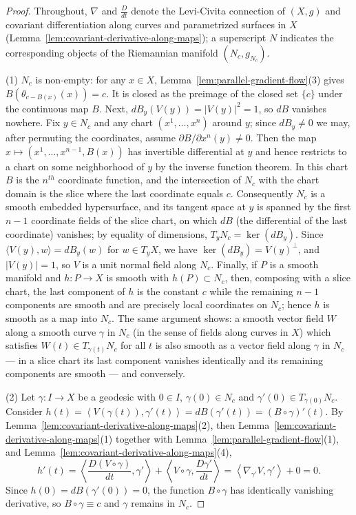 \begin{proof}
Throughout, $\nabla$ and $\frac{D}{dt}$ denote the Levi-Civita
connection of $(X,g)$ and covariant differentiation along curves and
parametrized surfaces in $X$
(Lemma~\ref{lem:covariant-derivative-along-maps}); a superscript $N$
indicates the corresponding objects of the Riemannian manifold
$(N_c,g_{N_c})$.

(1) $N_c$ is non-empty: for any $x\in X$,
Lemma~\ref{lem:parallel-gradient-flow}(3) gives
$B\left(\theta_{c-B(x)}(x)\right)=c$. It is closed as the preimage of
the closed set $\{c\}$ under the continuous map $B$. Next,
$dB_y(V(y))=|V(y)|^2=1$, so $dB$ vanishes nowhere. Fix $y\in N_c$ and
any chart $(x^1,\ldots,x^n)$ around $y$; since $dB_y\neq0$ we may, after
permuting the coordinates, assume $\partial B/\partial x^n(y)\neq0$.
Then the map $x\mapsto\left(x^1,\ldots,x^{n-1},B(x)\right)$ has
invertible differential at $y$ and hence restricts to a chart on some
neighborhood of $y$ by the inverse function theorem. In this chart $B$
is the $n^{th}$ coordinate function, and the intersection of $N_c$ with
the chart domain is the slice where the last coordinate equals $c$.
Consequently $N_c$ is a smooth embedded hypersurface, and its tangent
space at $y$ is spanned by the first $n-1$ coordinate fields of the
slice chart, on which $dB$ (the differential of the last coordinate)
vanishes; by equality of dimensions, $T_yN_c=\ker(dB_y)$. Since
$\langle V(y),w\rangle=dB_y(w)$ for $w\in T_yX$, we have
$\ker(dB_y)=V(y)^\perp$, and $|V(y)|=1$, so $V$ is a unit normal field
along $N_c$. Finally, if $P$ is a smooth manifold and $h\colon P\to X$
is smooth with $h(P)\subset N_c$, then, composing with a slice chart,
the last component of $h$ is the constant $c$ while the remaining $n-1$
components are smooth and are precisely local coordinates on $N_c$;
hence $h$ is smooth as a map into $N_c$. The same argument shows: a
smooth vector field $W$ along a smooth curve $\gamma$ in $N_c$ (in the
sense of fields along curves in $X$) which satisfies $W(t)\in
T_{\gamma(t)}N_c$ for all $t$ is also smooth as a vector field along
$\gamma$ in $N_c$ --- in a slice chart its last component vanishes
identically and its remaining components are smooth --- and conversely.

(2) Let $\gamma\colon I\to X$ be a geodesic with $0\in I$,
$\gamma(0)\in N_c$ and $\gamma'(0)\in T_{\gamma(0)}N_c$. Consider
$h(t)=\left\langle V(\gamma(t)),\gamma'(t)\right\rangle
=dB(\gamma'(t))=(B\circ\gamma)'(t)$. By
Lemma~\ref{lem:covariant-derivative-along-maps}(2), then
Lemma~\ref{lem:covariant-derivative-along-maps}(1) together with
Lemma~\ref{lem:parallel-gradient-flow}(1), and
Lemma~\ref{lem:covariant-derivative-along-maps}(4),
$$h'(t)=\left\langle\frac{D(V\circ\gamma)}{dt},\gamma'\right\rangle
+\left\langle V\circ\gamma,\frac{D\gamma'}{dt}\right\rangle
=\left\langle\nabla_{\gamma'}V,\gamma'\right\rangle+0=0 .$$
Since $h(0)=dB(\gamma'(0))=0$, the function $B\circ\gamma$ has
identically vanishing derivative, so $B\circ\gamma\equiv c$ and
$\gamma$ remains in $N_c$.


\end{proof}
